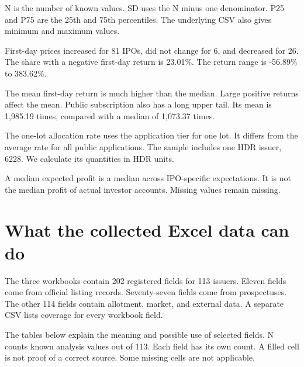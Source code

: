 \documentclass[10pt,a4paper]{article}
\begin{document}
N is the number of known values. SD uses the N minus one denominator. P25 and P75 are the 25th and 75th percentiles. The underlying CSV also gives minimum and maximum values.


First-day prices increased for 81 IPOs, did not change for 6, and decreased for 26. The share with a negative first-day return is 23.01\%. The return range is -56.89\% to 383.62\%.


The mean first-day return is much higher than the median. Large positive returns affect the mean. Public subscription also has a long upper tail. Its mean is 1,985.19 times, compared with a median of 1,073.37 times.


The one-lot allocation rate uses the application tier for one lot. It differs from the average rate for all public applications. The sample includes one HDR issuer, 6228. We calculate its quantities in HDR units.


A median expected profit is a median across IPO-specific expectations. It is not the median profit of actual investor accounts. Missing values remain missing.


\section*{What the collected Excel data can do}
The three workbooks contain 202 registered fields for 113 issuers. Eleven fields come from official listing records. Seventy-seven fields come from prospectuses. The other 114 fields contain allotment, market, and external data. A separate CSV lists coverage for every workbook field.


The tables below explain the meaning and possible use of selected fields. N counts known analysis values out of 113. Each field has its own count. A filled cell is not proof of a correct source. Some missing cells are not applicable.
\end{document}

